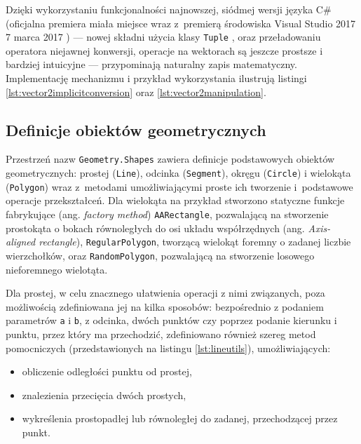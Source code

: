 Dzięki wykorzystaniu funkcjonalności najnowszej, siódmej wersji języka C\# (oficjalna premiera miała miejsce wraz z~premierą środowiska Visual Studio 2017 7 marca 2017 \cite{bib:visual2k17releasenotes}) --- nowej składni użycia klasy \verb|Tuple| \cite{bib:whatsnewin7}, oraz przeładowaniu operatora niejawnej konwersji, operacje na wektorach są jeszcze prostsze i bardziej intuicyjne --- przypominają naturalny zapis matematyczny. Implementację mechanizmu i przykład wykorzystania ilustrują listingi \ref{lst:vector2implicitconversion} oraz \ref{lst:vector2manipulation}.





\subsection{Definicje obiektów geometrycznych}
Przestrzeń nazw \verb|Geometry.Shapes| zawiera definicje podstawowych obiektów geometrycznych: prostej (\verb|Line|), odcinka (\verb|Segment|), okręgu (\verb|Circle|) i wielokąta (\verb|Polygon|) wraz z~metodami umożliwiającymi proste ich tworzenie i~podstawowe operacje przekształceń. Dla wielokąta na przykład stworzono statyczne funkcje fabrykujące (ang. \textit{factory method}) \verb|AARectangle|, pozwalającą na stworzenie prostokąta o bokach równoległych do osi układu współrzędnych (ang. \textit{Axis-aligned rectangle}), \verb|RegularPolygon|, tworzącą wielokąt foremny o zadanej liczbie wierzchołków, oraz \verb|RandomPolygon|, pozwalającą na stworzenie losowego nieforemnego wielotąta.

Dla prostej, w celu znacznego ułatwienia operacji z nimi związanych, poza możliwością zdefiniowana jej na kilka sposobów: bezpośrednio z podaniem parametrów \texttt{a} i \texttt{b}, z odcinka, dwóch punktów czy poprzez podanie kierunku i punktu, przez który ma przechodzić, zdefiniowano również szereg metod pomocniczych (przedstawionych na listingu \ref{lst:lineutils}), umożliwiających:
\begin{itemize}
	\item obliczenie odległości punktu od prostej,
	\item znalezienia przecięcia dwóch prostych,
	\item wykreślenia prostopadłej lub równoległej do zadanej, przechodzącej przez punkt.
\end{itemize}

